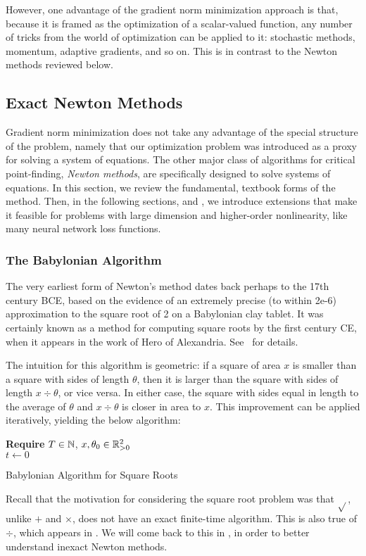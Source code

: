 \documentclass[../../thesis.tex]{subfiles}
\begin{document}
However, one advantage of the gradient norm minimization approach
is that, because it is framed as the optimization
of a scalar-valued function, any number of tricks
from the world of optimization can be applied to it:
stochastic methods, momentum, adaptive gradients,
and so on.
This is in contrast to the Newton methods reviewed below.

\subsection{Exact Newton Methods}

Gradient norm minimization does not take any advantage
of the special structure of the problem,
namely that our optimization problem was introduced
as a proxy for solving a system of equations.
The other major class of algorithms
for critical point-finding,
\emph{Newton methods},
are specifically designed to solve systems of equations.
In this section,
we review the fundamental, textbook forms
of the method.
Then, in the following sections,
 and ,
we introduce extensions that make it feasible for
problems with large dimension and higher-order nonlinearity,
like many neural network loss functions.

\subsubsection{The Babylonian Algorithm}

The very earliest form of Newton's method
dates back perhaps to the 17th century BCE,
based on the evidence of an extremely precise
(to within 2e-6)
approximation to the square root of 2
on a Babylonian clay tablet.
It was certainly known as a method
for computing square roots by the first century CE,
when it appears in the work of Hero of Alexandria.
See~\cite{brown1999} for details.

The intuition for this algorithm is geometric:
if a square of area $x$
is smaller than a square with sides of length $\theta$,
then it is larger than the square with sides of length $x \div \theta$,
or vice versa.
In either case, the square with sides equal in length to the average
of $\theta$ and $x \div \theta$
is closer in area to $x$.
This improvement can be applied iteratively,
yielding the below algorithm:
\begin{algorithm}[H]
    \SetAlgoLined{}
    \textbf{Require}
    $T\in \mathbb{N}$, $x, \theta_0 \in \mathbb{R}_{> 0}^2$\ \\
    $t \leftarrow 0$\\
    \caption{Babylonian Algorithm for Square Roots}
\end{algorithm}
\noindent Recall that the motivation for considering the square root problem
was that $\sqrt{}$, unlike $+$ and $\times$,
does not have an exact finite-time algorithm.
This is also true of $\div$, which appears in .
We will come back to this in ,
in order to better understand inexact Newton methods.
\end{document}
